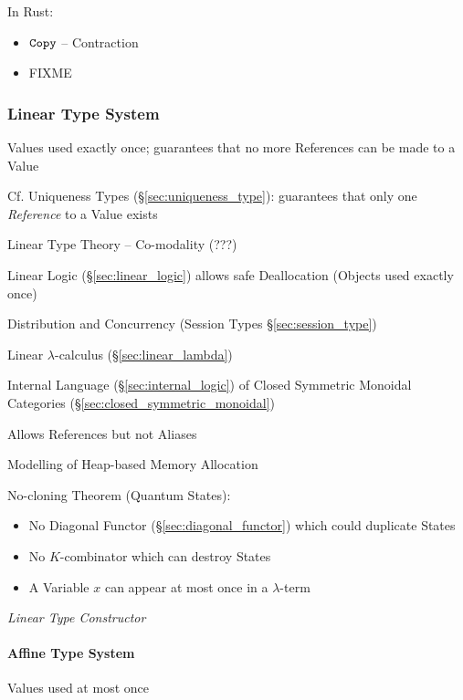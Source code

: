 In Rust:

\begin{itemize}
  \item $\mathtt{Copy}$ -- Contraction
  \item FIXME
\end{itemize}



\subsubsection{Linear Type System}\label{sec:linear_type}

Values used exactly once; guarantees that no more References can be
made to a Value

\fist Cf. Uniqueness Types (\S\ref{sec:uniqueness_type}): guarantees
that only one \emph{Reference} to a Value exists

Linear Type Theory -- Co-modality (???) %

Linear Logic (\S\ref{sec:linear_logic}) allows safe Deallocation
(Objects used exactly once)

Distribution and Concurrency (Session Types \S\ref{sec:session_type})

Linear $\lambda$-calculus (\S\ref{sec:linear_lambda})

Internal Language (\S\ref{sec:internal_logic}) of Closed Symmetric
Monoidal Categories (\S\ref{sec:closed_symmetric_monoidal})

Allows References but not Aliases

Modelling of Heap-based Memory Allocation

No-cloning Theorem (Quantum States):
\begin{itemize}
  \item No Diagonal Functor (\S\ref{sec:diagonal_functor})
    which could duplicate States
  \item No $K$-combinator which can destroy States
  \item A Variable $x$ can appear at most once in a $\lambda$-term
\end{itemize}

\emph{Linear Type Constructor} %



\paragraph{Affine Type System}\label{sec:affine_type}\hfill

Values used at most once


